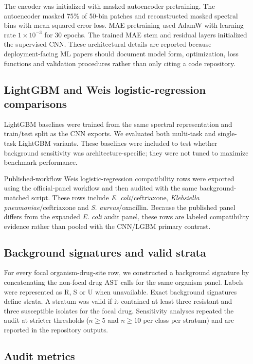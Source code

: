 \documentclass[11pt]{article}
\begin{document}
The encoder was initialized with masked autoencoder pretraining. The autoencoder masked 75\% of 50-bin patches and reconstructed masked spectral bins with mean-squared error loss. MAE pretraining used AdamW with learning rate $1\times10^{-3}$ for 30 epochs. The trained MAE stem and residual layers initialized the supervised CNN. These architectural details are reported because deployment-facing ML papers should document model form, optimization, loss functions and validation procedures rather than only citing a code repository\cite{tripodAI2024,probast2019}.

\subsection*{LightGBM and Weis logistic-regression comparisons}

LightGBM baselines were trained from the same spectral representation and train/test split as the CNN exports. We evaluated both multi-task and single-task LightGBM variants. These baselines were included to test whether background sensitivity was architecture-specific; they were not tuned to maximize benchmark performance.

Published-workflow Weis logistic-regression compatibility rows were exported using the official-panel workflow and then audited with the same background-matched script. These rows include \textit{E. coli}/ceftriaxone, \textit{Klebsiella pneumoniae}/ceftriaxone and \textit{S. aureus}/oxacillin. Because the published panel differs from the expanded \textit{E. coli} audit panel, these rows are labeled compatibility evidence rather than pooled with the CNN/LGBM primary contrast.

\subsection*{Background signatures and valid strata}

For every focal organism-drug-site row, we constructed a background signature by concatenating the non-focal drug AST calls for the same organism panel. Labels were represented as R, S or U when unavailable. Exact background signatures define strata. A stratum was valid if it contained at least three resistant and three susceptible isolates for the focal drug. Sensitivity analyses repeated the audit at stricter thresholds ($n\geq5$ and $n\geq10$ per class per stratum) and are reported in the repository outputs.

\subsection*{Audit metrics}
\end{document}
